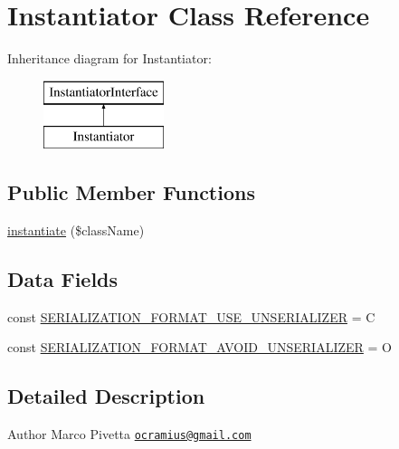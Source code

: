 \hypertarget{class_doctrine_1_1_instantiator_1_1_instantiator}{}\section{Instantiator Class Reference}
\label{class_doctrine_1_1_instantiator_1_1_instantiator}
Inheritance diagram for Instantiator\+:\begin{figure}[H]
\begin{center}
\leavevmode
\includegraphics[height=2.000000cm]{class_doctrine_1_1_instantiator_1_1_instantiator}
\end{center}
\end{figure}
\subsection*{Public Member Functions}
\begin{DoxyCompactItemize}
\item 
\mbox{\hyperlink{class_doctrine_1_1_instantiator_1_1_instantiator_a6d0d1226a8effb59e4b94606195c33ac}{instantiate}} (\$class\+Name)
\end{DoxyCompactItemize}
\subsection*{Data Fields}
\begin{DoxyCompactItemize}
\item 
const \mbox{\hyperlink{class_doctrine_1_1_instantiator_1_1_instantiator_a45a4fd0bf9c3d3c3109a607ae37fdb7d}{S\+E\+R\+I\+A\+L\+I\+Z\+A\+T\+I\+O\+N\+\_\+\+F\+O\+R\+M\+A\+T\+\_\+\+U\+S\+E\+\_\+\+U\+N\+S\+E\+R\+I\+A\+L\+I\+Z\+ER}} = \textquotesingle{}C\textquotesingle{}
\item 
const \mbox{\hyperlink{class_doctrine_1_1_instantiator_1_1_instantiator_aeb2e6db7d6deb38ad9f1372108cb19ac}{S\+E\+R\+I\+A\+L\+I\+Z\+A\+T\+I\+O\+N\+\_\+\+F\+O\+R\+M\+A\+T\+\_\+\+A\+V\+O\+I\+D\+\_\+\+U\+N\+S\+E\+R\+I\+A\+L\+I\+Z\+ER}} = \textquotesingle{}O\textquotesingle{}
\end{DoxyCompactItemize}


\subsection{Detailed Description}
\begin{DoxyAuthor}{Author}
Marco Pivetta \href{mailto:ocramius@gmail.com}{\tt ocramius@gmail.\+com} 
\end{DoxyAuthor}


